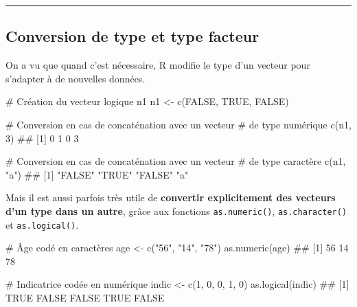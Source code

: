 \documentclass[12pt,twosided, notitlepage]{book}
\newenvironment{Shaded}{}{}
\newcommand{\KeywordTok}[1]{\textcolor[rgb]{0.00,0.00,1.00}{#1}}
\newcommand{\DecValTok}[1]{#1}
\newcommand{\StringTok}[1]{\textcolor[rgb]{0.00,0.50,0.50}{#1}}
\newcommand{\CommentTok}[1]{\textcolor[rgb]{0.00,0.50,0.00}{#1}}
\newcommand{\OtherTok}[1]{\textcolor[rgb]{1.00,0.25,0.00}{#1}}
\newcommand{\NormalTok}[1]{#1}
\renewenvironment{Shaded}{\begin{snugshade}}{\end{snugshade}}
\begin{document}
\begin{center}\rule{0.5\linewidth}{\linethickness}\end{center}

\subsection{Conversion de type et type
facteur}\label{conversion-de-type-et-type-facteur}

On a vu que quand c'est nécessaire, R modifie le type d'un vecteur pour
s'adapter à de nouvelles données.

\begin{Shaded}
\begin{Highlighting}[]
\CommentTok{# Création du vecteur logique n1}
\NormalTok{n1 <-}\StringTok{ }\KeywordTok{c}\NormalTok{(}\OtherTok{FALSE}\NormalTok{, }\OtherTok{TRUE}\NormalTok{, }\OtherTok{FALSE}\NormalTok{)}

\CommentTok{# Conversion en cas de concaténation avec un vecteur }
\CommentTok{# de type numérique}
\KeywordTok{c}\NormalTok{(n1, }\DecValTok{3}\NormalTok{)}
\NormalTok{  ## [1] 0 1 0 3}

\CommentTok{# Conversion en cas de concaténation avec un vecteur }
\CommentTok{# de type caractère}
\KeywordTok{c}\NormalTok{(n1, }\StringTok{"a"}\NormalTok{)}
\NormalTok{  ## [1] "FALSE" "TRUE"  "FALSE" "a"}
\end{Highlighting}
\end{Shaded}

Mais il est aussi parfois très utile de \textbf{convertir explicitement
des vecteurs d'un type dans un autre}, grâce aux fonctions
\texttt{as.numeric()},
\texttt{as.character()} et
\texttt{as.logical()}.

\begin{Shaded}
\begin{Highlighting}[]
\CommentTok{# Âge codé en caractères}
\NormalTok{age <-}\StringTok{ }\KeywordTok{c}\NormalTok{(}\StringTok{"56"}\NormalTok{, }\StringTok{"14"}\NormalTok{, }\StringTok{"78"}\NormalTok{)}
\KeywordTok{as.numeric}\NormalTok{(age)}
\NormalTok{  ## [1] 56 14 78}

\CommentTok{# Indicatrice codée en numérique}
\NormalTok{indic <-}\StringTok{ }\KeywordTok{c}\NormalTok{(}\DecValTok{1}\NormalTok{, }\DecValTok{0}\NormalTok{, }\DecValTok{0}\NormalTok{, }\DecValTok{1}\NormalTok{, }\DecValTok{0}\NormalTok{)}
\KeywordTok{as.logical}\NormalTok{(indic)}
\NormalTok{  ## [1]  TRUE FALSE FALSE  TRUE FALSE}
\end{Highlighting}
\end{Shaded}
\end{document}
